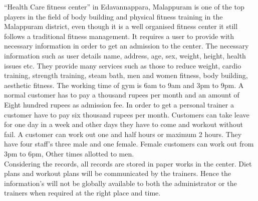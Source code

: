 \documentclass[a4paper,12pt,toc=flat]{report}
\begin{document}
{{		\hspace*{12pt} “Health Care fitness center” in Edavannappara, Malappuram is one of the top players in the field of body building and physical fitness training in the Malappuram district, even though it is a well organised fitness center it still follows a traditional fitness management. It requires a user to provide with necessary information in order to get an admission to the center. The necessary information such as user details name, address, age, sex, weight, height, health issues  etc. They provide many services such as those to reduce weight, cardio training, strength training, steam bath, men and women fitness, body building, aesthetic fitness. The working time of gym is 6am to 9am and 3pm to 9pm. A normal customer has to pay a thousand rupees per month and an amount of Eight hundred rupees as admission fee. In order to get a personal trainer a customer have to pay six thousand rupees per month. Customers can take leave for one day in a week and other days they have to come and workout without fail. A customer can work out one and half hours or maximum 2 hours. They have four staff’s three male and one female. Female customers can work out from 3pm to 6pm, Other times allotted to men.
		\\
		\hspace*{12pt}
		Considering the records, all records are stored in paper works in the center. Diet plans and workout plans will be communicated by the trainers. Hence the information’s will not be globally available to both the administrator or the trainers when required at the right place and time.
		
		
	}
	
	\pagebreak
}
\end{document}
